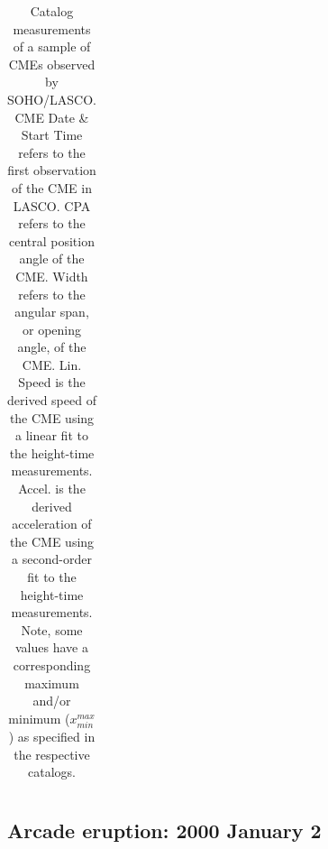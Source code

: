 \documentclass[referee,a4paper,12pt,traditabstract]{swsc}
\begin{document}
\begin{table}[!t]
\begin{tabular}{l*{5}{c}r}
\end{tabular}
\caption{Catalog measurements of a sample of CMEs observed by SOHO/LASCO. CME Date \& Start Time refers to the first observation of the CME in LASCO. CPA refers to the central position angle of the CME. Width refers to the angular span, or opening angle, of the CME. Lin. Speed is the derived speed of the CME using a linear fit to the height-time measurements. Accel. is the derived acceleration of the CME using a second-order fit to the height-time measurements. Note, some values have a corresponding maximum and/or minimum ($x_{min}^{max}$) as specified in the respective catalogs.}
\label{event_table}
\end{table}


\subsection{Arcade eruption: 2000 January 2}
\label{sect_20000102}
\end{document}
